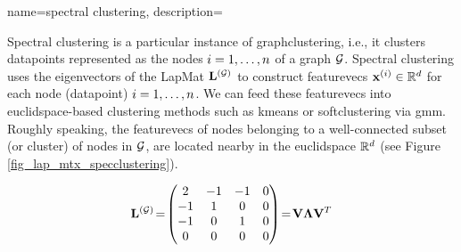 {name={spectral clustering},
	description={Spectral clustering is a particular instance of 
		\gls{graphclustering}, i.e., it clusters \gls{datapoint}s 
		represented as the nodes $i=1,\ldots,n$ of a \gls{graph} $\mathcal{G}$. 
		Spectral clustering uses the \gls{eigenvector}s of the \gls{LapMat} ${\bf L}^{(\mathcal{G})}$ 
		to construct \gls{featurevec}s ${\bf x}^{(i)} \in \mathbb{R}^{d}$ 
		for each node (\gls{datapoint}) $i=1,\ldots,n$. We can feed these \gls{featurevec}s 
		into \gls{euclidspace}-based \gls{clustering} methods such as \gls{kmeans} 
		or \gls{softclustering} via \gls{gmm}. Roughly speaking, the \gls{featurevec}s of nodes 
		belonging to a well-connected subset (or \gls{cluster}) of nodes in $\mathcal{G}$, are located 
		nearby in the \gls{euclidspace} $\mathbb{R}^{d}$ (see Figure \ref{fig_lap_mtx_specclustering}). 
		\begin{figure}
			\begin{center}
				\begin{minipage}{0.4\textwidth}
				\end{minipage} 
				\hspace*{5mm}
				\begin{minipage}{0.4\textwidth}
					\begin{equation} 
						\LapMat{\graph}\!=\!
						\begin{pmatrix} 
							2 & -1 & -1 & 0 \\ 
							-1 & 1 & 0 & 0 \\  
							-1 & 0 & 1 & 0 \\ 
							0 & 0 & 0 & 0 
						\end{pmatrix}\!=\!\mathbf{V} {\bm \Lambda} \mathbf{V}^{T}  

\end{equation}
\end{minipage}
\end{center}
\end{figure}}}
